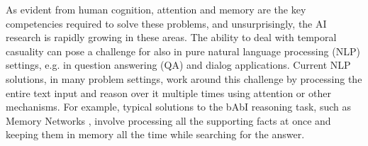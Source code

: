 As evident from human cognition, attention and memory are the key competencies required to solve these problems, and unsurprisingly, the AI research is rapidly growing in these areas.
The ability to deal with temporal casuality can pose a challenge for also in pure natural language processing (NLP) settings, e.g. in question answering (QA) and dialog applications.  
Current NLP solutions, in many problem settings, work around this challenge by processing the entire text input and reason over it multiple times using attention \cite{vaswani2017attention} or other mechanisms.
For example, typical solutions to the bAbI reasoning task, such as Memory Networks \cite{weston2014memory}, involve processing all the supporting facts at once and keeping them in memory all the time while searching for the answer.



%
%


